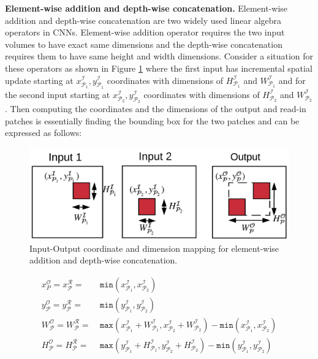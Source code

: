 \vspace{2mm}
\noindent \textbf{Element-wise addition and depth-wise concatenation.}
Element-wise addition and depth-wise concatenation are two widely used linear algebra operators in CNNs.
Element-wise addition operator requires the two input volumes to have exact same dimensions and the depth-wise concatenation requires them to have same height and width dimensions.
Consider a situation for these operators as shown in Figure \ref{fig:la_operators} where the first input has incremental spatial update starting at $x^\mathcal{I}_{\mathcal{P}_1},y^\mathcal{I}_{\mathcal{P}_1}$ coordinates with dimensions of $H^\mathcal{I}_{\mathcal{P}_1}$ and $W^\mathcal{I}_{\mathcal{P}_1}$ and for the second input starting at $x^\mathcal{I}_{\mathcal{P}_2},y^\mathcal{I}_{\mathcal{P}_2}$ coordinates with dimensions of $H^\mathcal{I}_{\mathcal{P}_2}$ and $W^\mathcal{I}_{\mathcal{P}_2}$.
Then computing the coordinates and the dimensions of the output and read-in patches is essentially finding the bounding box for the two patches and can be expressed as follows:


\begin{figure}[t]
\includegraphics[width=\columnwidth]{images/la_operators}
\caption{Input-Output coordinate and dimension mapping for element-wise addition and depth-wise concatenation.}
\label{fig:la_operators}
\end{figure}

\begin{align}
\label{eqn:laxcoordinate}
x^\mathcal{O}_P = x^\mathcal{R}_\mathcal{P} =&~ \texttt{min}(x^\mathcal{I}_{\mathcal{P}_1},x^\mathcal{I}_{\mathcal{P}_2})\\
\label{eqn:laycoordinate}
y^\mathcal{O}_\mathcal{P} = y^\mathcal{R}_\mathcal{P} =&~ \texttt{min}(y^\mathcal{I}_{\mathcal{P}_1},y^\mathcal{I}_{\mathcal{P}_2})\\
\label{eqn:lapatchwidth}
W^\mathcal{O}_\mathcal{P} = W^\mathcal{R}_\mathcal{P} =&~ \texttt{max}(x^\mathcal{I}_{\mathcal{P}_1}+W^\mathcal{I}_{\mathcal{P}_1},x^\mathcal{I}_{\mathcal{P}_2}+W^\mathcal{I}_{\mathcal{P}_2})-\texttt{min}(x^\mathcal{I}_{\mathcal{P}_1},x^\mathcal{I}_{\mathcal{P}_2})\\
\label{eqn:lapatchheight}
H^\mathcal{O}_\mathcal{P} = H^\mathcal{R}_\mathcal{P} =&~ \texttt{max}(y^\mathcal{I}_{\mathcal{P}_1}+H^\mathcal{I}_{\mathcal{P}_1},y^\mathcal{I}_{\mathcal{P}_2}+H^\mathcal{I}_{\mathcal{P}_2})-\texttt{min}(y^\mathcal{I}_{\mathcal{P}_1},y^\mathcal{I}_{\mathcal{P}_2})
\end{align}


